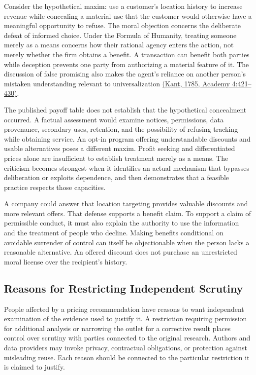 \noindent \noindent Consider the hypothetical maxim: use a customer's location
history to increase revenue while concealing a material use that the
customer would otherwise have a meaningful opportunity to refuse. The
moral objection concerns the deliberate defeat of informed choice. Under
the Formula of Humanity, treating someone merely as a means concerns how
their rational agency enters the action, not merely whether the firm
obtains a benefit. A transaction can benefit both parties while
deception prevents one party from authorizing a material feature of it.
The discussion of false promising also makes the agent's reliance on
another person's mistaken understanding relevant to universalization
\href{https://www.earlymoderntexts.com/assets/pdfs/kant1785.pdf}{(Kant,
1785, Academy 4:421--430)}.

The published payoff table does not establish that the hypothetical
concealment occurred. A factual assessment would examine notices,
permissions, data provenance, secondary uses, retention, and the
possibility of refusing tracking while obtaining service. An opt-in
program offering understandable discounts and usable alternatives poses
a different maxim. Profit seeking and differentiated prices alone are
insufficient to establish treatment merely as a means. The criticism
becomes strongest when it identifies an actual mechanism that bypasses
deliberation or exploits dependence, and then demonstrates that a
feasible practice respects those capacities.

A company could answer that location targeting provides valuable
discounts and more relevant offers. That defense supports a benefit
claim. To support a claim of permissible conduct, it must also explain
the authority to use the information and the treatment of people who
decline. Making benefits conditional on avoidable surrender of control
can itself be objectionable when the person lacks a reasonable
alternative. An offered discount does not purchase an unrestricted moral
license over the recipient's history.

\hypertarget{M09-reasons-for-restricting-independent-scrutiny}{%
\subsection{Reasons for Restricting Independent
Scrutiny}\label{M09-reasons-for-restricting-independent-scrutiny}}

\noindent \noindent People affected by a pricing recommendation have reasons to
want independent examination of the evidence used to justify it. A
restriction requiring permission for additional analysis or narrowing
the outlet for a corrective result places control over scrutiny with
parties connected to the original research. Authors and data providers
may invoke privacy, contractual obligations, or protection against
misleading reuse. Each reason should be connected to the particular
restriction it is claimed to justify.

